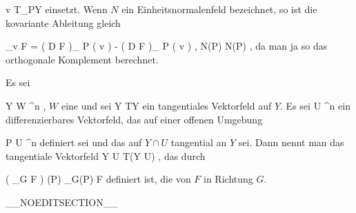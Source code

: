 \mavergleichskette
{\vergleichskette
{ v
}
{ \in }{ T_PY
}
{  }{
}
{    }{
}
{   }{
}
}
{}{}{}
einsetzt. Wenn $N$ ein Einheitsnormalenfeld bezeichnet, so ist die kovariante Ableitung gleich

\mavergleichskettedisp
{\vergleichskette
{ \nabla_v F
}
{ =} { \left(  D F   \right)_{ P } \left(  v  \right) -  \left\langle  \left(  D F   \right)_{ P } \left(  v  \right)  ,  N(P)  \right\rangle N(P)
}
{ } {
}
{ } {
}
{ } {
}
}
{}{}{,}
da man ja so das orthogonale Komplement berechnet.

{}
{

Es sei

\mavergleichskette
{\vergleichskette
{ Y
}
{ \subseteq }{ W
}
{ \subseteq }{ \R^n
}
{    }{
}
{   }{
}
}
{}{}{,}
$W$
eine
und sei
 { Y } { TY
} {}
ein tangentiales Vektorfeld auf $Y$. Es sei
 { U} { \R^n
} {}
ein differenzierbares Vektorfeld, das auf einer offenen Umgebung

\mavergleichskette
{\vergleichskette
{ P
}
{ \in }{ U
}
{ \subseteq }{ \R^n
}
{    }{
}
{   }{
}
}
{}{}{}
definiert sei und das auf $Y \cap U$  tangential an $Y$ sei. Dann nennt man das tangentiale Vektorfeld
 { Y \cap U } { T(Y \cap U)
} {,}
das durch

\mavergleichskettedisp
{\vergleichskette
{ \left(  \nabla_G F  \right) (P)
}
{ } { \nabla_{G(P)} F }
{ } {
}
{ } {
}
{ } {
}
}
{}{}{}
definiert ist, die
von $F$ in Richtung $G$.

}

__NOEDITSECTION__

